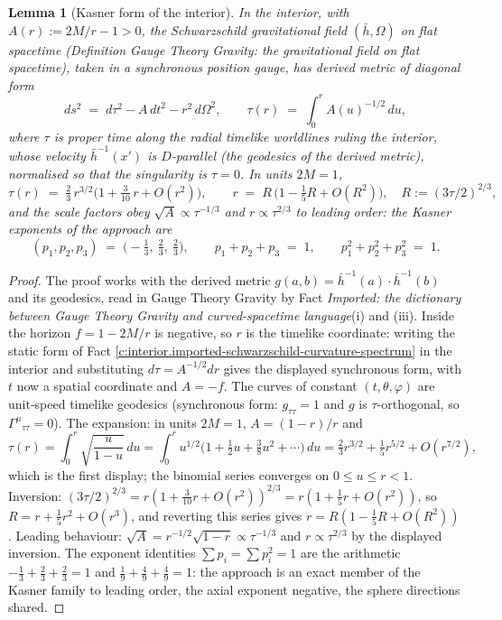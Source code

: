 \documentclass[11pt]{article}
\newtheorem{lemma}[theorem]{Lemma}
\theoremstyle{definition}
\theoremstyle{plain}
\newcommand{\changedmark}[2]{\marginpar{\raggedright\scriptsize\color{#1}#2}}
\providecommand{\hb}{}\renewcommand{\hb}{\bar{h}}
\begin{document}
\begin{lemma}[Kasner form of the interior]\label{c:interior.kasner-form-interior}
\changedmark{gray}{reworded}
In the interior, with $A(r) := 2M/r - 1 > 0$, the Schwarzschild gravitational field $(\hb, \Omega)$ on flat spacetime (Definition \emph{Gauge Theory Gravity: the gravitational field on flat spacetime}), taken in a synchronous position gauge, has derived metric of diagonal form
\[
ds^2 \;=\; d\tau^2 - A\,dt^2 - r^2\,d\Omega^2,
\qquad
\tau(r) \;=\; \int_0^r A(u)^{-1/2}\,du ,
\]
where $\tau$ is proper time along the radial timelike worldlines ruling the interior, whose velocity $\hb^{-1}(x')$ is $D$-parallel (the geodesics of the derived metric), normalised so that the singularity is $\tau = 0$. In units $2M = 1$,
\[
\tau(r) \;=\; \tfrac23\, r^{3/2}\bigl(1 + \tfrac{3}{10}\,r + O(r^2)\bigr),
\qquad
r \;=\; R\,\bigl(1 - \tfrac15 R + O(R^2)\bigr), \quad R := (3\tau/2)^{2/3},
\]
and the scale factors obey $\sqrt{A} \propto \tau^{-1/3}$ and $r \propto \tau^{2/3}$ to leading order: the Kasner exponents of the approach are
\[
(p_1, p_2, p_3) \;=\; \bigl(-\tfrac13,\ \tfrac23,\ \tfrac23\bigr),
\qquad
p_1 + p_2 + p_3 \;=\; 1, \qquad p_1^2 + p_2^2 + p_3^2 \;=\; 1 .
\]
\end{lemma}
\begin{proof}
The proof works with the derived metric $g(a,b) = \hb^{-1}(a) \cdot \hb^{-1}(b)$ and its geodesics, read in Gauge Theory Gravity by Fact \emph{Imported: the dictionary between Gauge Theory Gravity and curved-spacetime language}(i) and (iii). Inside the horizon $f = 1 - 2M/r$ is negative, so $r$ is the timelike coordinate: writing the static form of Fact \ref{c:interior.imported-schwarzschild-curvature-spectrum} in the interior and substituting $d\tau = A^{-1/2}dr$ gives the displayed synchronous form, with $t$ now a spatial coordinate and $A = -f$. The curves of constant $(t,\theta,\varphi)$ are unit-speed timelike geodesics (synchronous form: $g_{\tau\tau} = 1$ and $g$ is $\tau$-orthogonal, so $\Gamma^\mu{}_{\tau\tau} = 0$). The expansion: in units $2M = 1$, $A = (1-r)/r$ and
\[
\tau(r) = \int_0^r \sqrt{\frac{u}{1-u}}\,du
= \int_0^r u^{1/2}\bigl(1 + \tfrac12 u + \tfrac38 u^2 + \cdots\bigr)\,du
= \tfrac23 r^{3/2} + \tfrac15 r^{5/2} + O(r^{7/2}),
\]
which is the first display; the binomial series converges on $0 \le u \le r < 1$. Inversion: $(3\tau/2)^{2/3} = r(1 + \tfrac{3}{10}r + O(r^2))^{2/3} = r(1 + \tfrac15 r + O(r^2))$, so $R = r + \tfrac15 r^2 + O(r^3)$, and reverting this series gives $r = R(1 - \tfrac15 R + O(R^2))$. Leading behaviour: $\sqrt A = r^{-1/2}\sqrt{1-r} \propto \tau^{-1/3}$ and $r \propto \tau^{2/3}$ by the displayed inversion. The exponent identities $\sum p_i = \sum p_i^2 = 1$ are the arithmetic $-\tfrac13 + \tfrac23 + \tfrac23 = 1$ and $\tfrac19 + \tfrac49 + \tfrac49 = 1$: the approach is an exact member of the Kasner family to leading order, the axial exponent negative, the sphere directions shared.

\end{proof}
\end{document}
